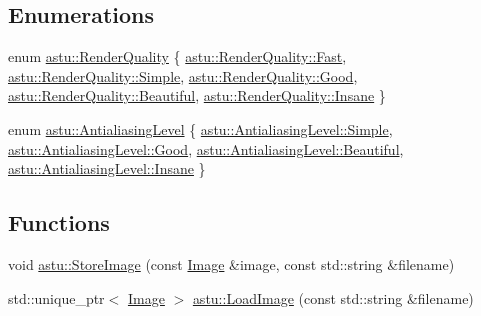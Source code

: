 \subsection*{Enumerations}
\begin{DoxyCompactItemize}
\item 
enum \hyperlink{group__gfx__group_gac3b4955f341cea44f53f8446d734cd54}{astu\+::\+Render\+Quality} \{ \newline
\hyperlink{group__gfx__group_ggac3b4955f341cea44f53f8446d734cd54ae16b5b7f26f54214445cbe38d72c2828}{astu\+::\+Render\+Quality\+::\+Fast}, 
\hyperlink{group__gfx__group_ggac3b4955f341cea44f53f8446d734cd54a1fbb1e3943c2c6c560247ac8f9289780}{astu\+::\+Render\+Quality\+::\+Simple}, 
\hyperlink{group__gfx__group_ggac3b4955f341cea44f53f8446d734cd54a0c6ad70beb3a7e76c3fc7adab7c46acc}{astu\+::\+Render\+Quality\+::\+Good}, 
\hyperlink{group__gfx__group_ggac3b4955f341cea44f53f8446d734cd54a9c8c29335006d9e40eef25192524c99f}{astu\+::\+Render\+Quality\+::\+Beautiful}, 
\newline
\hyperlink{group__gfx__group_ggac3b4955f341cea44f53f8446d734cd54a77529ad508ab7d3b5a99adc7e711040b}{astu\+::\+Render\+Quality\+::\+Insane}
 \}
\item 
enum \hyperlink{group__gfx__group_ga7bcac32f8bae9bfd1f21655d4734efe8}{astu\+::\+Antialiasing\+Level} \{ \hyperlink{group__gfx__group_gga7bcac32f8bae9bfd1f21655d4734efe8a1fbb1e3943c2c6c560247ac8f9289780}{astu\+::\+Antialiasing\+Level\+::\+Simple}, 
\hyperlink{group__gfx__group_gga7bcac32f8bae9bfd1f21655d4734efe8a0c6ad70beb3a7e76c3fc7adab7c46acc}{astu\+::\+Antialiasing\+Level\+::\+Good}, 
\hyperlink{group__gfx__group_gga7bcac32f8bae9bfd1f21655d4734efe8a9c8c29335006d9e40eef25192524c99f}{astu\+::\+Antialiasing\+Level\+::\+Beautiful}, 
\hyperlink{group__gfx__group_gga7bcac32f8bae9bfd1f21655d4734efe8a77529ad508ab7d3b5a99adc7e711040b}{astu\+::\+Antialiasing\+Level\+::\+Insane}
 \}
\end{DoxyCompactItemize}
\subsection*{Functions}
\begin{DoxyCompactItemize}
\item 
void \hyperlink{group__gfx__group_gaca5f9cb8047c60049300242c20d30cd6}{astu\+::\+Store\+Image} (const \hyperlink{classastu_1_1Image}{Image} \&image, const std\+::string \&filename)
\item 
std\+::unique\+\_\+ptr$<$ \hyperlink{classastu_1_1Image}{Image} $>$ \hyperlink{group__gfx__group_ga46ac561eac42d4ace785797db8bc89a0}{astu\+::\+Load\+Image} (const std\+::string \&filename)
\end{DoxyCompactItemize}


